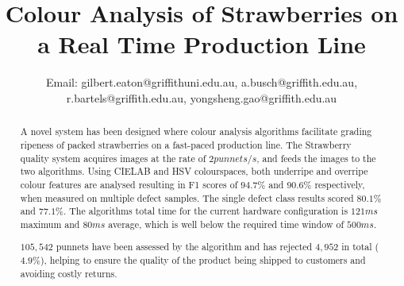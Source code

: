 \documentclass[conference]{IEEEtran}
\begin{document}
%
\title{Colour Analysis of Strawberries on a Real Time Production Line}




\author{

Email: gilbert.eaton@griffithuni.edu.au,
a.busch@griffith.edu.au,
r.bartels@griffith.edu.au,
yongsheng.gao@griffith.edu.au}



\maketitle


\begin{abstract}


A novel system has been designed where colour analysis algorithms facilitate grading ripeness of packed strawberries on a fast-paced production line. The Strawberry quality system acquires images at the rate of $2 punnets/s$, and feeds the images to the two algorithms. Using CIELAB and HSV colourspaces, both underripe and overripe colour features are analysed  resulting in F1 scores of $94.7\%$ and $90.6\%$ respectively, when measured on multiple defect samples. The single defect class results scored $80.1\%$ and $77.1\%$. The algorithms total time for the current hardware configuration is $121ms$ maximum and $80ms$ average, which is well below the required time window of $500ms$.

$105,542$ punnets have been assessed by the algorithm and has rejected $4,952$ in total ($4.9\%$),  helping to ensure the quality of the product being shipped to customers and avoiding costly returns.


\end{abstract}
\end{document}
